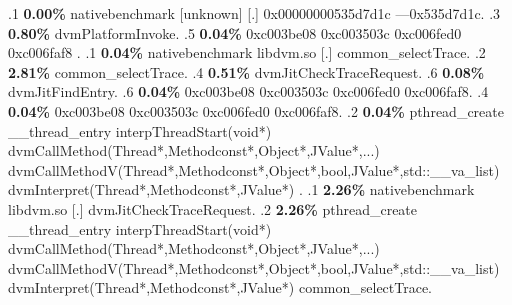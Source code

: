 \begin{profile}
{.1 \textbf{ 0.00\%} nativebenchmark  [unknown]              [.] 0x00000000535d7d1c\newline {} ---0x535d7d1c. 
.3 \textbf{0.80\%} dvmPlatformInvoke. 
.5 \textbf{0.04\%} 0xc003be08\newline {} 0xc003503c\newline {} 0xc006fed0\newline {} 0xc006faf8\newline {} . 
.1 \textbf{ 0.04\%} nativebenchmark  libdvm.so              [.] common\_selectTrace. 
.2 \textbf{2.81\%} common\_selectTrace. 
.4 \textbf{0.51\%} dvmJitCheckTraceRequest. 
.6 \textbf{0.08\%} dvmJitFindEntry. 
.6 \textbf{0.04\%} 0xc003be08\newline {} 0xc003503c\newline {} 0xc006fed0\newline {} 0xc006faf8. 
.4 \textbf{0.04\%} 0xc003be08\newline {} 0xc003503c\newline {} 0xc006fed0\newline {} 0xc006faf8. 
.2 \textbf{0.04\%} pthread\_create\newline {} \_\_thread\_entry\newline {} interpThreadStart(void*)\newline {} dvmCallMethod(Thread*,Methodconst*,Object*,JValue*,...)\newline {} dvmCallMethodV(Thread*,Methodconst*,Object*,bool,JValue*,std::\_\_va\_list)\newline {} dvmInterpret(Thread*,Methodconst*,JValue*)\newline {} . 
.1 \textbf{ 2.26\%} nativebenchmark  libdvm.so              [.] dvmJitCheckTraceRequest. 
.2 \textbf{2.26\%} pthread\_create\newline {} \_\_thread\_entry\newline {} interpThreadStart(void*)\newline {} dvmCallMethod(Thread*,Methodconst*,Object*,JValue*,...)\newline {} dvmCallMethodV(Thread*,Methodconst*,Object*,bool,JValue*,std::\_\_va\_list)\newline {} dvmInterpret(Thread*,Methodconst*,JValue*)\newline {} common\_selectTrace. 
}
\end{profile}
